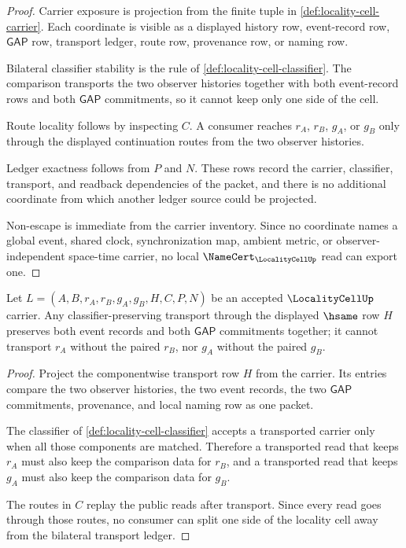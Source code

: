 \begin{proof}
Carrier exposure is projection from the finite tuple in \autoref{def:locality-cell-carrier}. Each coordinate is visible as a displayed history row, event-record row, $\mathsf{GAP}$ row, transport ledger, route row, provenance row, or naming row.

Bilateral classifier stability is the rule of \autoref{def:locality-cell-classifier}. The comparison transports the two observer histories together with both event-record rows and both $\mathsf{GAP}$ commitments, so it cannot keep only one side of the cell.

Route locality follows by inspecting $C$. A consumer reaches $r_A$, $r_B$, $g_A$, or $g_B$ only through the displayed continuation routes from the two observer histories.

Ledger exactness follows from $P$ and $N$. These rows record the carrier, classifier, transport, and readback dependencies of the packet, and there is no additional coordinate from which another ledger source could be projected.

Non-escape is immediate from the carrier inventory. Since no coordinate names a global event, shared clock, synchronization map, ambient metric, or observer-independent space-time carrier, no local $\NameCert_{\LocalityCellUp}$ read can export one.
\end{proof}

\begin{theorem}
\label{thm:locality-cell-hsame-transport}
Let $L=(A,B,r_A,r_B,g_A,g_B,H,C,P,N)$ be an accepted $\LocalityCellUp$ carrier. Any classifier-preserving transport through the displayed $\hsame$ row $H$ preserves both event records and both $\mathsf{GAP}$ commitments together; it cannot transport $r_A$ without the paired $r_B$, nor $g_A$ without the paired $g_B$.
\end{theorem}
\begin{proof}
Project the componentwise transport row $H$ from the carrier. Its entries compare the two observer histories, the two event records, the two $\mathsf{GAP}$ commitments, provenance, and local naming row as one packet.

The classifier of \autoref{def:locality-cell-classifier} accepts a transported carrier only when all those components are matched. Therefore a transported read that keeps $r_A$ must also keep the comparison data for $r_B$, and a transported read that keeps $g_A$ must also keep the comparison data for $g_B$.

The routes in $C$ replay the public reads after transport. Since every read goes through those routes, no consumer can split one side of the locality cell away from the bilateral transport ledger.
\end{proof}

